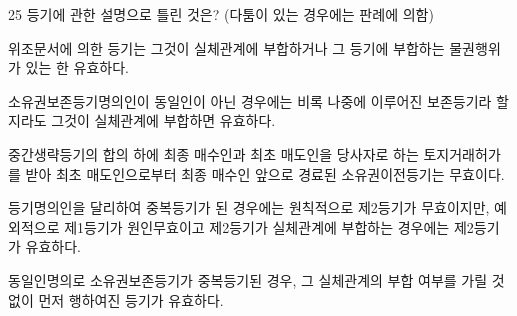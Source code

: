 \begin{question}{25}
등기에 관한 설명으로 틀린 것은? (다툼이 있는 경우에는 판례에 의함)
\begin{choices}
  \item 위조문서에 의한 등기는 그것이 실체관계에 부합하거나 그 등기에 부합하는 물권행위가 있는 한 유효하다.
  \item 소유권보존등기명의인이 동일인이 아닌 경우에는 비록 나중에 이루어진 보존등기라 할지라도 그것이 실체관계에 부합하면 유효하다.
  \item 중간생략등기의 합의 하에 최종 매수인과 최초 매도인을 당사자로 하는 토지거래허가를 받아 최초 매도인으로부터 최종 매수인 앞으로 경료된 소유권이전등기는 무효이다.
  \item 등기명의인을 달리하여 중복등기가 된 경우에는 원칙적으로 제2등기가 무효이지만, 예외적으로 제1등기가 원인무효이고 제2등기가 실체관계에 부합하는 경우에는 제2등기가 유효하다.
  \item 동일인명의로 소유권보존등기가 중복등기된 경우, 그 실체관계의 부합 여부를 가릴 것 없이 먼저 행하여진 등기가 유효하다.
\end{choices}
\end{question}
